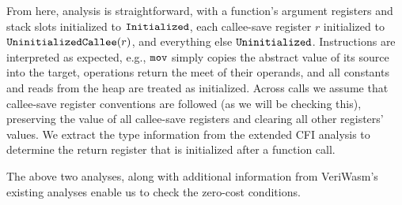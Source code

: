 From here, analysis is straightforward, with a function's argument registers and
stack slots initialized to $\mathtt{Initialized}$, each callee-save register $r$ initialized
to $\mathtt{UninitializedCallee}({r})$, and everything else $\mathtt{Uninitialized}$.
%
Instructions are interpreted as expected, e.g., $\mathtt{mov}$ simply copies the
abstract value of its source into the target, operations return the meet of
their operands, and all constants and reads from the heap are treated as
initialized.
%
Across calls we assume that callee-save register conventions are followed (as we
will be checking this), preserving the value of all callee-save registers and
clearing all other registers' values.
%
We extract the type information from the extended CFI analysis to
determine the return register that is initialized after a function call.

%
The above two analyses, along with additional information from VeriWasm's existing analyses enable us to check the zero-cost conditions.
%
